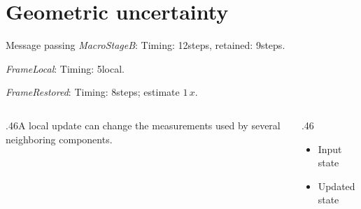 \documentclass[9pt,aspectratio=169]{beamer}
\newcommand{\fuzzlayerA}[1]{\textit{#1}}
\newcommand{\fuzzlayerB}[1]{\fuzzlayerA{#1}}
\newcommand{\fuzzterm}[1]{\fuzzlayerB{#1}}
\newcommand{\fuzzpair}[2]{\fuzzterm{#1}: #2}
\newcommand{\fuzzunit}{steps}
\let\fuzzoriginalunit\fuzzunit
\newcommand{\fuzzcoefficient}{1}
\newcommand{\fuzzscale}[2][\fuzzcoefficient]{#1\,#2}
\begin{document}
\section{Geometric uncertainty}
\begin{frame}[t]{Message passing}
\fuzzpair{MacroStageB}{Timing: 12\fuzzunit, retained: 9\fuzzoriginalunit.}\par
{\renewcommand{\fuzzunit}{local}\fuzzpair{FrameLocal}{Timing: 5\fuzzunit.}\par}
\fuzzpair{FrameRestored}{Timing: 8\fuzzunit; estimate $\fuzzscale{x}$.}\par
\begin{columns}[T]\begin{column}{.46\textwidth}A local update can change the measurements used by several neighboring components.\end{column}\begin{column}{.46\textwidth}\begin{itemize}\item Input state\item Updated state\end{itemize}\end{column}\end{columns}
\end{frame}
\end{document}
